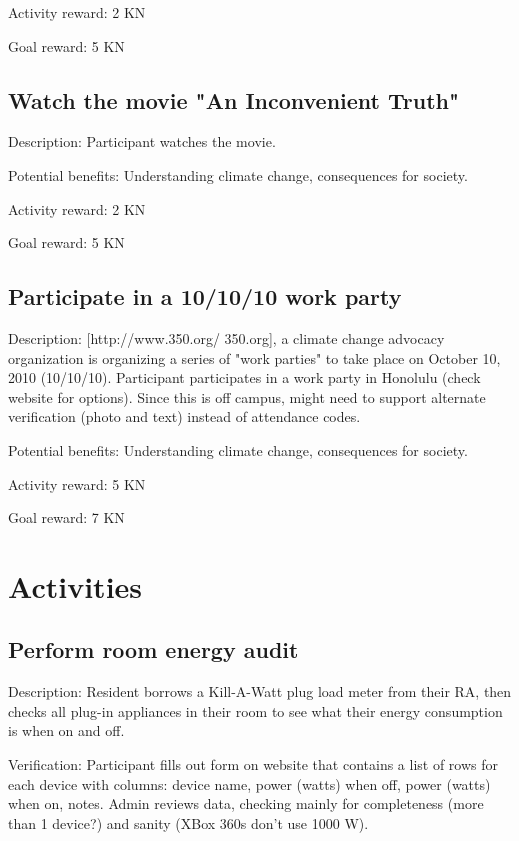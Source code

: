 Activity reward: 2 KN

Goal reward: 5 KN

\subsection{Watch the movie "An Inconvenient Truth"}

Description: Participant watches the movie.

Potential benefits: Understanding climate change, consequences for society.

Activity reward: 2 KN

Goal reward: 5 KN

\subsection{Participate in a 10/10/10 work party}

Description: [http://www.350.org/ 350.org], a climate change advocacy organization is organizing a series of "work parties" to take place on October 10, 2010 (10/10/10). Participant participates in a work party in Honolulu (check website for options). Since this is off campus, might need to support alternate verification (photo and text) instead of attendance codes.

Potential benefits: Understanding climate change, consequences for society.

Activity reward: 5 KN

Goal reward: 7 KN


\section{Activities}

\subsection{Perform room energy audit}

Description: Resident borrows a Kill-A-Watt plug load meter from their RA, then checks all plug-in appliances in their room to see what their energy consumption is when on and off.

Verification: Participant fills out form on website that contains a list of rows for each device with columns: device name, power (watts) when off, power (watts) when on, notes. Admin reviews data, checking mainly for completeness (more than 1 device?) and sanity (XBox 360s don't use 1000 W).

